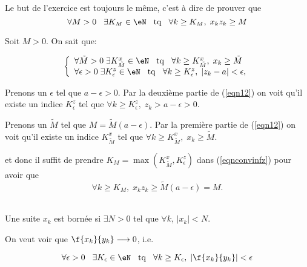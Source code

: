 Le but de l'exercice est toujours le même, c'est à dire de prouver que 
\begin{equation}		\label{eqnconvinfz}
  \forall M > 0 \hspace{0.3cm} \exists K_M \in \eN \hspace{0.3cm} {\rm tq} \hspace{0.3cm} \forall k \geq K_M, \;x_k  z_k \geq M 
\end{equation}

\noindent Soit $M>0$. On sait  que:

\begin{equation}
\label{eqn12}\left\{\begin{array}{l}   
        \forall \tilde{M} >0 \;\exists K^x_{\tilde{M}} \in \eN \hspace{0.3cm} {\rm tq} \hspace{0.3cm} \forall k \geq K^x_{\tilde{M}},\; x_k \geq  \tilde{M} \\																		 
       \forall \epsilon >0\;\exists K^z_\epsilon \in \eN \hspace{0.3cm} {\rm tq} \hspace{0.3cm} \forall k \geq K^z_\epsilon,\; |z_k-a| <\epsilon,																		
\end{array}\right.\end{equation}

\noindent Prenons un $\epsilon$ tel que $a-\epsilon>0$. Par la deuxième partie de (\ref{eqn12}) on voit qu'il existe un indice $ K^z_\epsilon$ tel que $ \forall k \geq K^z_\epsilon,\; z_k > a-\epsilon >0$.

\noindent Prenons un $\tilde{M}$ tel que $M= \tilde{M}(a-\epsilon)$. Par la première partie de (\ref{eqn12}) on voit qu'il existe un indice $ K^x_{\tilde{M}} $ tel que $\forall k \geq K^x_{\tilde{M}},\; x_k \geq  \tilde{M} $.

												
\noindent et donc il suffit  de prendre  $K_M = \max(K_{\tilde{M}}^x, K^z_\epsilon)$ dans (\ref{eqnconvinfz}) pour avoir que 
\[ \forall k \geq K_M, \;x_k  z_k \geq \tilde{M}(a-\epsilon)=M.\]


\\

\noindent Une suite $x_k$ est bornée si $\exists N>0$ tel que $\forall k$, $|x_k| < N$.

\noindent On veut voir que $\f{x_k}{y_k}\longrightarrow 0$, i.e.

\begin{equation} 
\label{eqnconvborne}  \forall  \epsilon > 0 \hspace{0.3cm} \exists K_\epsilon \in \eN \hspace{0.3cm} {\rm tq} \hspace{0.3cm} \forall k \geq K_\epsilon, \; |\f{x_k}{y_k}| < \epsilon \end{equation}

